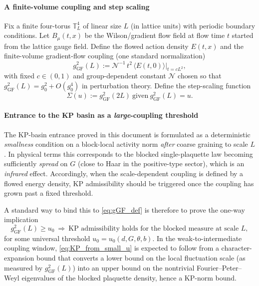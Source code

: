 \paragraph{A finite-volume coupling and step scaling}
Fix a finite four-torus $\mathbb T_L^4$ of linear size $L$ (in lattice units) with periodic boundary conditions.
Let $B_\mu(t,x)$ be the Wilson/gradient flow field at flow time $t$ started from the lattice gauge field.
Define the flowed action density $E(t,x)$ and the finite-volume gradient-flow coupling (one standard normalization)
\begin{equation}\label{eq:gGF_def}
 g_{\mathrm{GF}}^2(L) := \mathcal N^{-1}\, t^2\,\langle E(t,0)\rangle\Big|_{t=c L^2},
\end{equation}
with fixed $c\in(0,1)$ and group-dependent constant $\mathcal N$ chosen so that $g_{\mathrm{GF}}^2(L)=g_0^2+O(g_0^4)$ in perturbation theory.
Define the step-scaling function
\begin{equation}\label{eq:stepscaling_def_plan}
 \Sigma(u) := g_{\mathrm{GF}}^2(2L)\ \text{given}\ g_{\mathrm{GF}}^2(L)=u.
\end{equation}

\paragraph{Entrance to the KP basin as a \emph{large}-coupling threshold}
The KP-basin entrance proved in this document is formulated as a deterministic \emph{smallness} condition
on a block-local activity norm \emph{after} coarse graining to scale $L$.
In physical terms this corresponds to the blocked single-plaquette law becoming sufficiently \emph{spread} on $G$
(close to Haar in the positive-type sector), which is an \emph{infrared} effect.
Accordingly, when the scale-dependent coupling is defined by a flowed energy density,
KP admissibility should be triggered once the coupling has grown past a fixed threshold.

A standard way to bind this to \eqref{eq:gGF_def} is therefore to prove the one-way implication
\begin{equation}\label{eq:KP_from_small_u}
 g_{\mathrm{GF}}^2(L)\ge u_0\ \Longrightarrow\ \text{KP admissibility holds for the blocked measure at scale $L$},
\end{equation}
for some universal threshold $u_0=u_0(d,G,\theta,b)$.
In the weak-to-intermediate coupling window, \eqref{eq:KP_from_small_u} is expected to follow from a character-expansion
bound that converts a lower bound on the local fluctuation scale (as measured by $g_{\mathrm{GF}}^2(L)$)
into an upper bound on the nontrivial Fourier--Peter--Weyl eigenvalues of the blocked plaquette density,
hence a KP-norm bound.

